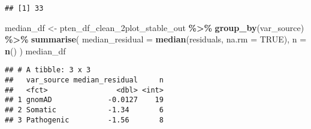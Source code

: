 \documentclass[
]{article}
\newenvironment{Shaded}{\begin{snugshade}}{\end{snugshade}}
\newcommand{\AttributeTok}[1]{\textcolor[rgb]{0.13,0.29,0.53}{#1}}
\newcommand{\ConstantTok}[1]{\textcolor[rgb]{0.56,0.35,0.01}{#1}}
\newcommand{\FunctionTok}[1]{\textcolor[rgb]{0.13,0.29,0.53}{\textbf{#1}}}
\newcommand{\NormalTok}[1]{#1}
\newcommand{\OtherTok}[1]{\textcolor[rgb]{0.56,0.35,0.01}{#1}}
\newcommand{\SpecialCharTok}[1]{\textcolor[rgb]{0.81,0.36,0.00}{\textbf{#1}}}
\begin{document}
\begin{verbatim}
## [1] 33
\end{verbatim}

\begin{Shaded}
\begin{Highlighting}[]
\NormalTok{median\_df }\OtherTok{\textless{}{-}}\NormalTok{ pten\_df\_clean\_2plot\_stable\_out }\SpecialCharTok{\%\textgreater{}\%}
  \FunctionTok{group\_by}\NormalTok{(var\_source) }\SpecialCharTok{\%\textgreater{}\%}
  \FunctionTok{summarise}\NormalTok{(}
    \AttributeTok{median\_residual =} \FunctionTok{median}\NormalTok{(residuals, }\AttributeTok{na.rm =} \ConstantTok{TRUE}\NormalTok{),}
    \AttributeTok{n =} \FunctionTok{n}\NormalTok{()}
\NormalTok{  )}
\NormalTok{median\_df}
\end{Highlighting}
\end{Shaded}

\begin{verbatim}
## # A tibble: 3 x 3
##   var_source median_residual     n
##   <fct>                <dbl> <int>
## 1 gnomAD             -0.0127    19
## 2 Somatic            -1.34       6
## 3 Pathogenic         -1.56       8
\end{verbatim}
\end{document}

